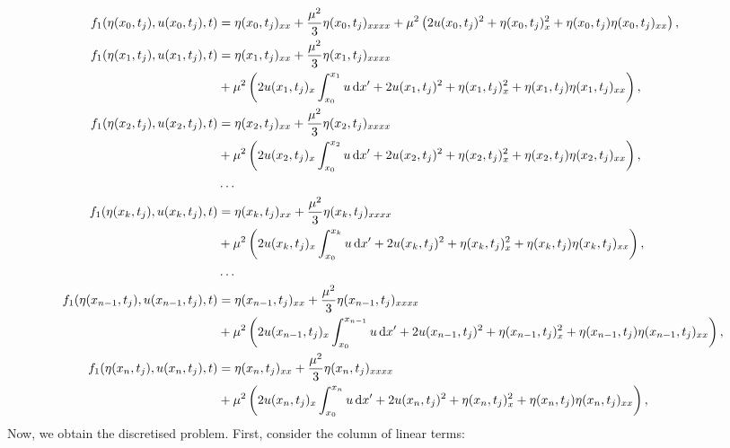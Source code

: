 \documentclass[10pt,reqno,oneside,a4paper]{article}
\begin{document}
\begin{align*} f_1(\eta(x_0, t_j), u(x_0, t_j), t) &= \eta(x_0, t_j)_{xx} + \frac{\mu^2}{3} \eta(x_0, t_j)_{xxxx} + \mu^2 \left(2 u(x_0, t_j)^2 + \eta(x_0, t_j)^2_x + \eta(x_0, t_j)\eta(x_0, t_j)_{xx} \right), \\
f_1(\eta(x_1, t_j), u(x_1, t_j), t) &= \eta(x_1, t_j)_{xx} + \frac{\mu^2}{3} \eta(x_1, t_j)_{xxxx} \\
&+ \mu^2 \left(2 u(x_1, t_j)_{x} \int^{x_1}_{x_0} u \,\mathrm{d} x' + 2 u(x_1, t_j)^2 + \eta(x_1, t_j)^2_x + \eta(x_1, t_j)\eta(x_1, t_j)_{xx} \right), \\
f_1(\eta(x_2, t_j), u(x_2, t_j), t) &= \eta(x_2, t_j)_{xx} + \frac{\mu^2}{3} \eta(x_2, t_j)_{xxxx} \\
&+ \mu^2 \left(2 u(x_2, t_j)_{x} \int^{x_2}_{x_0} u \,\mathrm{d} x' + 2 u(x_2, t_j)^2 + \eta(x_2, t_j)^2_x + \eta(x_2, t_j)\eta(x_2, t_j)_{xx} \right), \\
&\ldots \\
f_1(\eta(x_k, t_j), u(x_k, t_j), t) &= \eta(x_k, t_j)_{xx} + \frac{\mu^2}{3} \eta(x_k, t_j)_{xxxx} \\
&+ \mu^2 \left( 2 u(x_k, t_j)_{x} \int^{x_k}_{x_0} u \,\mathrm{d} x' +2 u(x_k, t_j)^2 + \eta(x_k, t_j)^2_x + \eta(x_k, t_j)\eta(x_k, t_j)_{xx} \right), \\
&\ldots \\
f_1(\eta(x_{n-1}, t_j), u(x_{n-1}, t_j), t) &= \eta(x_{n-1}, t_j)_{xx} + \frac{\mu^2}{3} \eta(x_{n-1}, t_j)_{xxxx} \\
&+ \mu^2 \left( 2 u(x_{n-1}, t_j)_{x} \int^{x_{n-1}}_{x_0} u \,\mathrm{d} x' +2 u(x_{n-1}, t_j)^2 + \eta(x_{n-1}, t_j)^2_x + \eta(x_{n-1}, t_j)\eta(x_{n-1}, t_j)_{xx} \right), \\
f_1(\eta(x_{n}, t_j), u(x_{n}, t_j), t) &= \eta(x_{n}, t_j)_{xx} + \frac{\mu^2}{3} \eta(x_{n}, t_j)_{xxxx} \\
&+ \mu^2 \left( 2 u(x_{n}, t_j)_{x} \int^{x_{n}}_{x_0} u \,\mathrm{d} x' +2 u(x_{n}, t_j)^2 + \eta(x_{n}, t_j)^2_x + \eta(x_{n}, t_j)\eta(x_{n}, t_j)_{xx} \right),
\end{align*}
Now, we obtain the discretised problem. First, consider the column of linear terms:
\end{document}
